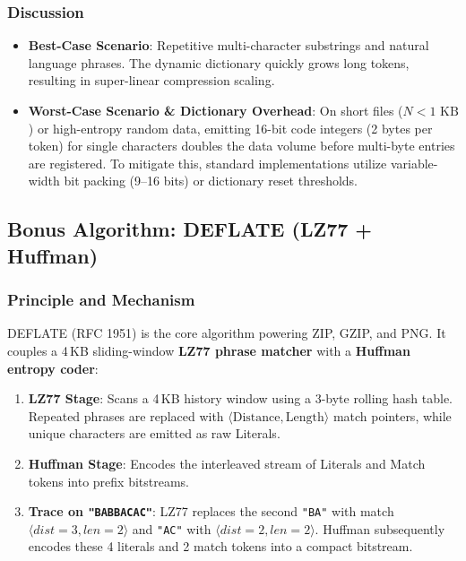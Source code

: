 \documentclass[12pt,a4paper]{article}
\begin{document}
\subsubsection{Discussion}
\begin{itemize}
    \item \textbf{Best-Case Scenario}: Repetitive multi-character substrings and natural language phrases. The dynamic dictionary quickly grows long tokens, resulting in super-linear compression scaling.
    \item \textbf{Worst-Case Scenario \& Dictionary Overhead}: On short files ($N < 1\text{ KB}$) or high-entropy random data, emitting 16-bit code integers (2 bytes per token) for single characters doubles the data volume before multi-byte entries are registered. To mitigate this, standard implementations utilize variable-width bit packing (9--16 bits) or dictionary reset thresholds.
\end{itemize}

\subsection{Bonus Algorithm: DEFLATE (LZ77 + Huffman)}

\subsubsection{Principle and Mechanism}
DEFLATE (RFC 1951) is the core algorithm powering ZIP, GZIP, and PNG. It couples a 4\,KB sliding-window \textbf{LZ77 phrase matcher} with a \textbf{Huffman entropy coder}:
\begin{enumerate}
    \item \textbf{LZ77 Stage}: Scans a 4\,KB history window using a 3-byte rolling hash table. Repeated phrases are replaced with $\langle\text{Distance}, \text{Length}\rangle$ match pointers, while unique characters are emitted as raw Literals.
    \item \textbf{Huffman Stage}: Encodes the interleaved stream of Literals and Match tokens into prefix bitstreams.
    \item \textbf{Trace on \texttt{"BABBACAC"}}: LZ77 replaces the second \texttt{"BA"} with match $\langle dist=3, len=2\rangle$ and \texttt{"AC"} with $\langle dist=2, len=2\rangle$. Huffman subsequently encodes these 4 literals and 2 match tokens into a compact bitstream.
\end{enumerate}
\end{document}
